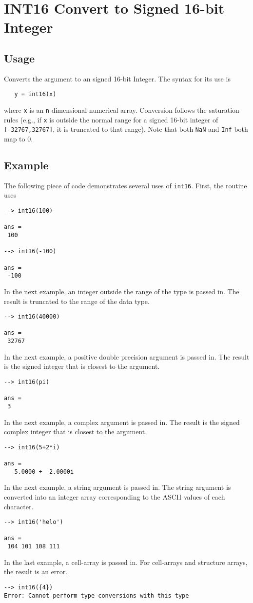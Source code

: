 \section{INT16 Convert to Signed 16-bit Integer}

\subsection{Usage}

Converts the argument to an signed 16-bit Integer.  The syntax
for its use is
\begin{verbatim}
   y = int16(x)
\end{verbatim}
where \verb|x| is an \verb|n|-dimensional numerical array.  Conversion
follows the saturation rules (e.g., if \verb|x| is outside the normal
range for a signed 16-bit integer of \verb|[-32767,32767]|, it is truncated
to that range).  Note that both \verb|NaN| and \verb|Inf| both map to 0.
\subsection{Example}

The following piece of code demonstrates several uses of \verb|int16|.  First, the routine uses
\begin{verbatim}
--> int16(100)

ans = 
 100 

--> int16(-100)

ans = 
 -100 
\end{verbatim}
In the next example, an integer outside the range  of the type is passed in.  
The result is truncated to the range of the data type.
\begin{verbatim}
--> int16(40000)

ans = 
 32767 
\end{verbatim}
In the next example, a positive double precision argument is passed in.  
The result is the signed integer that is closest to the argument.
\begin{verbatim}
--> int16(pi)

ans = 
 3 
\end{verbatim}
In the next example, a complex argument is passed in.  The result is the 
signed complex integer that is closest to the argument.
\begin{verbatim}
--> int16(5+2*i)

ans = 
   5.0000 +  2.0000i 
\end{verbatim}
In the next example, a string argument is passed in.  The string argument is 
converted into an integer array corresponding to the ASCII values of each character.
\begin{verbatim}
--> int16('helo')

ans = 
 104 101 108 111 
\end{verbatim}
In the last example, a cell-array is passed in.  For cell-arrays and 
structure arrays, the result is an error.
\begin{verbatim}
--> int16({4})
Error: Cannot perform type conversions with this type
\end{verbatim}
